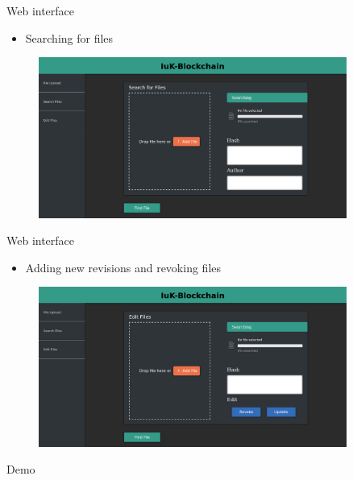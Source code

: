 \documentclass[10pt]{beamer}
\begin{document}
\begin{frame}{Web interface}
	\begin{itemize}
		\item Searching for files
	\end{itemize}
	\begin{figure}
		\includegraphics[width=0.9\textwidth]{images/search.png}
	\end{figure}
\end{frame}

\begin{frame}{Web interface}
	\begin{itemize}
		\item Adding new revisions and revoking files
	\end{itemize}
	\begin{figure}
		\includegraphics[width=0.9\textwidth]{images/edit.png}
	\end{figure}
\end{frame}

\begin{frame}{Demo}
\end{frame}

\end{document}
